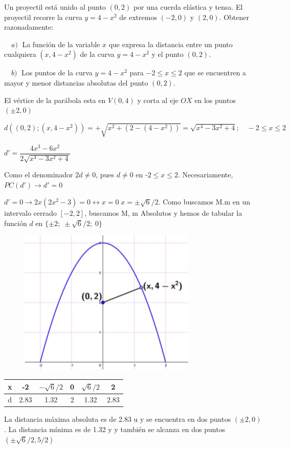 	\begin{ejre} Un proyectil está unido al punto $(0, 2)$ por una cuerda elástica y tensa. El proyectil recorre la curva $y = 4 -x^2$ de extremos $( -2, 0)$ y $(2, 0)$. Obtener razonadamente:

	$\quad a)\; $ La función de la variable $x$ que expresa la distancia entre un punto cualquiera $(x, 4 -x^2)$ de la curva $y=4-x^2$ y el punto $(0,2)$. 
	
	$\quad b)\; $ Los puntos de la curva $y = 4 -x^2$ para $ - 2 \le  x \le  2$ que se encuentren a mayor y menor distancias absolutas del punto $(0,2)$. 
	\end{ejre}
	
	\begin{proofw}\renewcommand{\qedsymbol}{$\diamond$}

	El vértice de la parábola esta en $V(0,4)$ y corta al eje $OX$ en los puntos $(\pm 2, 0)$
	
	$d\left( (0,2); (x,4-x^2)  \right)= +\sqrt{x^2+(2-(4-x^2))}=\sqrt {x^4-3x^2+4}; \quad -2\le x \le 2$
	 
	 $d'=\dfrac {4x^3-6x^2}{2 \sqrt {x^4-3x^2+4}}$
	 
	 Como el denominador $2d\neq 0$, pues $d\neq 0$ en -$2\le x \le 2$. Necesariamente, $PC(d') \to d'=0$
	
	\begin{multicols}{2}

	$d'=0 \to 2x(2x^2-3)=0 \leftrightarrow x=0 \; x=\pm \sqrt{6}/2$. Como buscamos M.m en un intervalo cerrado $[-2,2]$, buscamos M, m Absolutos y hemos de tabular la función $d$ en $\{\pm 2; \; \pm \sqrt{6}/2; \; 0 \}$
	
	\begin{figure}[H]
	\centering
	\includegraphics[width=.3\textwidth]{imagenes/imagenes05/T05IM23.png}
	\end{figure}
	
	\end{multicols}
	
	
	
		
	\begin{table}[H]
	\centering
	\begin{tabular}{|c|c|c|c|c|c|}
	\hline
	 x& -2 & $-\sqrt{6}/2$ & 0 & $\sqrt{6}/2$ & 2 \\ \hline
 	d&  2.83& 1.32 & 2 & 1.32 & 2.83 \\ \hline
	\end{tabular}
	\end{table}	
		
	
	

	
	La distancia máxima absoluta es de 2.83 u y se encuentra en dos puntos $(\pm2,0)$. 	La distancia mínima es de 1.32 y y también se alcanza en dos puntos $(\pm \sqrt{6}/2, 5/2)$
	
	\end{proofw}


